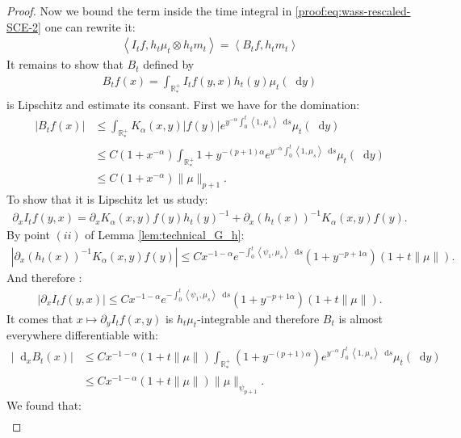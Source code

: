 \documentclass[11pt,a4paper]{article}
\newcommand{\RRP}{\mathbb{R}^+_*}
\newcommand{\brac}[1]{\left\langle#1\right\rangle}
\newcommand{\dd}{\mathop{}\!\mathrm{d}}
\begin{document}
\begin{proof}
    Now we bound the term inside the time integral in \eqref{proof:eq:wass-rescaled-SCE-2} one can rewrite it:
    \begin{align*}
        \brac{I_tf,h_t\mu_t \otimes h_t m_t} = \brac{B_tf,h_tm_t}
    \end{align*}
    It remains to show that $B_t$ defined by
    \begin{align*}
        B_tf(x) = \int_{\RRP} I_tf(y,x) h_t(y) \mu_t(\dd y)
    \end{align*}
    is Lipschitz and estimate its consant. First we have for the domination:
    \begin{align*}
        \left|B_tf(x) \right| 
        &\leq \int_{\RRP} K_\alpha(x,y)\left|f(y) \right| e^{ y^{-\alpha} \int_0^t \brac{1,\mu_s} \dd s} \mu_t(\dd y) \\
        &\leq C(1 + x^{-\alpha})\int_{\RRP} 1 + y^{-(p+1)\alpha} e^{y^{-\alpha}\int_0^t \brac{1,\mu_s} \dd s} \mu_t(\dd y) \\
        &\leq C(1 + x^{-\alpha}) \|\mu\|_{p+1}.
    \end{align*}
    To show that it is Lipschitz let us study:
    \begin{align*}
        \partial_x I_tf(y,x) = \partial_x K_\alpha(x,y)f(y)h_t(y)^{-1} + \partial_x \left(h_t(x)\right)^{-1} K_\alpha(x,y)f(y).
    \end{align*}
    By point $(ii)$ of Lemma \ref{lem:technical_G_h}:
    \begin{align*}
        \left| \partial_x \left(h_t(x)\right)^{-1} K_\alpha(x,y)f(y)\right| \leq  C x^{-1-\alpha} e^{-\int_0^t \brac{\psi_1,\mu_s}\dd s}(1 + y^{-{p + 1}\alpha}) (1 + t\|\mu\|).
    \end{align*}
    And therefore :
    \begin{align*}
        \left| \partial_x I_tf(y,x)\right| \leq C x^{-1-\alpha} e^{-\int_0^t \brac{\psi_1,\mu_s}\dd s} (1 + y^{-{p + 1}\alpha}) (1 + t\|\mu\|).
    \end{align*}
    It comes that $x \mapsto \partial_y I_tf(x,y)$ is $h_t\mu_t$-integrable and therefore $B_t$ is almost everywhere differentiable with:
    \begin{align*}
        \left| \dd_x B_t(x)\right| 
        &\leq C x^{-1-\alpha} (1 + t\|\mu\|) \int_{\RRP} (1 + y^{-(p + 1)\alpha}) e^{y^{-\alpha}\int_0^t \brac{1,\mu_s} \dd s} \mu_t(\dd y) \\
        &\leq C x^{-1-\alpha} (1 + t\|\mu\|) \|\mu\|_{\psi_{p+1}}.
    \end{align*}
    We found that:
    \begin{align*}

\end{align*}
\end{proof}
\end{document}

